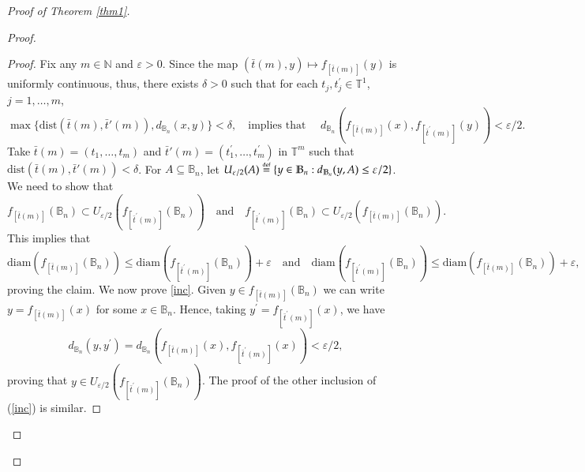 \documentclass[11pt,reqno]{amsart}
\theoremstyle{plain}
\newtheorem*{theorem A}{Theorem A}
\newtheorem*{theorem B}{Theorem B}
\newtheorem*{theorem C}{Theorem C}
\newtheorem*{theorem 1}{Theorem 1}
\newtheorem*{theorem 2}{Theorem 2}
\newtheorem*{theorem 3}{Theorem 3}
\newcommand{\eqdef}{\stackrel{\scriptscriptstyle\rm def}{=}}
\numberwithin{equation}{section}
\begin{document}
\begin{proof}[Proof of Theorem \ref{thm1}]
\begin{proof}
\begin{proof}
Fix any $m \in \mathbb{N}$ and $\varepsilon>0$. Since the map $(\bar t(m),y)\mapsto f_{[\bar t(m)]}(y)$ is uniformly continuous, thus, there exists $\delta > 0$ such that for each $t_j, t^{\prime}_j \in \mathbb{T}^1$, $j=1, \dots, m$,
$$ \max \{\mathrm{dist} (\bar t(m) , \bar t'(m)),d_{\mathbb{B}_n}(x,y) \} < \delta, \quad \text{implies \ that } \quad d_{\mathbb{B}_n}(f_{[\bar t(m)]}(x) , f_{[\bar t^{\prime}(m)]}(y))<\varepsilon/2.$$
Take $\bar t(m)= (t_1, \dots, t_m)$ and $\bar t'(m)=(t^{\prime}_1, \dots, t^{\prime}_m)$ in $\mathbb{T}^m$ such that $ \mathrm{dist} (\bar t(m) , \bar t'(m)) < \delta$. For $A \subseteq \mathbb{B}_n$, let $U_{\varepsilon /2}(A) \eqdef \{y \in \mathbb{B}_n : d_{\mathbb{B}_n}(y,A)\leq \varepsilon /2\}$.
We need to show that
\begin{equation}\label{inc}
f_{[\bar t(m)]}(\mathbb{B}_n)\subset U_{\varepsilon/2}(f_{[\bar t^{\prime}(m)]}(\mathbb{B}_n)) \quad \text{and} \quad f_{[\bar t^{\prime}(m)]}(\mathbb{B}_n)\subset U_{\varepsilon/2}(f_{[\bar t(m)]}(\mathbb{B}_n)).
\end{equation}
This implies that
$$\text{diam}(f_{[\bar t(m)]}(\mathbb{B}_n))\leq \text{diam}(f_{[\bar t^{\prime}(m)]}(\mathbb{B}_n)) + \varepsilon \quad \text{and} \quad \text{diam}(f_{[\bar t^{\prime}(m)]}(\mathbb{B}_n))\leq \text{diam}(f_{[\bar t(m)]}(\mathbb{B}_n)) + \varepsilon,$$ proving the claim.
We now prove \eqref{inc}. Given $y \in f_{[\bar t(m)]}(\mathbb{B}_n)$ we can write $y=f_{[\bar t(m)]}(x)$ for some $x \in \mathbb{B}_n$. Hence, taking $y^{\prime}=f_{[\bar t^{\prime}(m)]}(x)$, we have
\begin{equation*}
  d_{\mathbb{B}_n}(y,y^{\prime})=d_{\mathbb{B}_n}(f_{[\bar t(m)]}(x),f_{[\bar t^{\prime}(m)]}(x))<\varepsilon/2,
\end{equation*}
proving that $y \in U_{\varepsilon/2}(f_{[\bar t^{\prime}(m)]}(\mathbb{B}_n))$. The proof of the other inclusion of (\ref{inc}) is similar.
\end{proof}


\end{proof}
\end{proof}
\end{document}
